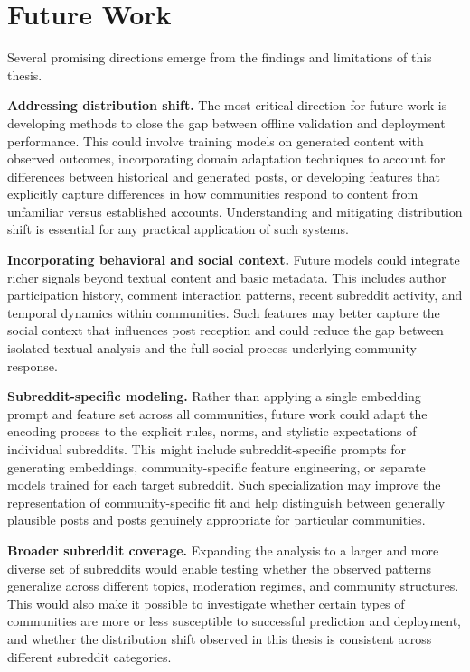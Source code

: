 \section{Future Work}
\label{sec:future_work}

Several promising directions emerge from the findings and limitations of this thesis.

\textbf{Addressing distribution shift.} The most critical direction for future work is developing methods to close the gap between offline validation and deployment performance. This could involve training models on generated content with observed outcomes, incorporating domain adaptation techniques to account for differences between historical and generated posts, or developing features that explicitly capture differences in how communities respond to content from unfamiliar versus established accounts. Understanding and mitigating distribution shift is essential for any practical application of such systems.

\textbf{Incorporating behavioral and social context.} Future models could integrate richer signals beyond textual content and basic metadata. This includes author participation history, comment interaction patterns, recent subreddit activity, and temporal dynamics within communities. Such features may better capture the social context that influences post reception and could reduce the gap between isolated textual analysis and the full social process underlying community response.

\textbf{Subreddit-specific modeling.} Rather than applying a single embedding prompt and feature set across all communities, future work could adapt the encoding process to the explicit rules, norms, and stylistic expectations of individual subreddits. This might include subreddit-specific prompts for generating embeddings, community-specific feature engineering, or separate models trained for each target subreddit. Such specialization may improve the representation of community-specific fit and help distinguish between generally plausible posts and posts genuinely appropriate for particular communities.

\textbf{Broader subreddit coverage.} Expanding the analysis to a larger and more diverse set of subreddits would enable testing whether the observed patterns generalize across different topics, moderation regimes, and community structures. This would also make it possible to investigate whether certain types of communities are more or less susceptible to successful prediction and deployment, and whether the distribution shift observed in this thesis is consistent across different subreddit categories.


